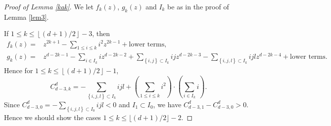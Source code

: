 \documentclass[12pt]{amsart}
\theoremstyle{definition}
\theoremstyle{remark}
\numberwithin{equation}{section}
\def\NZQ{\mathbb}               %
\def\ZZ{{\NZQ Z}}
\begin{document}
\begin{proof}[Proof of Lemma \ref{kak}]
	We let $f_k(z)$, $g_k(z)$ and  $I_k$ be as in the proof of Lemma \ref{lem3}.
	 
	If $1 \leq k \leq \left\lfloor (d+1)/2 \right\rfloor -3$, then
	\begin{displaymath}
	\begin{aligned}
	f_k(z)=&z^{2k+1}-\sum\limits_{1 \leq i \leq k}i^2z^{2k-1}+\text{lower terms},\\
	g_k(z)=&z^{d-2k-1}-\sum\limits_{i\in I_k}iz^{d-2k-2}+\sum\limits_{\left\{i,j\right\}\subset I_k}ijz^{d-2k-3}-\sum\limits_{\left\{i,j,l\right\}\subset I_k}ijlz^{d-2k-4}+\text{lower terms}.
	\end{aligned} 
	\end{displaymath}
	Hence for $1 \leq k \leq \left\lfloor (d+1)/2 \right\rfloor -1$,
	$$C_{d-3,k}^d=-\sum\limits_{\left\{i,j,l\right\}\subset I_k}ijl+\left(\sum\limits_{1 \leq i \leq k}i^2\right)\cdot\left(\sum\limits_{i\in I_k}i\right).$$
  Since $C_{d-3,0}^d=-\sum_{\left\{i,j,l\right\}\subset I_0}ijl<0$
  and  $I_1 \subset I_0$,	%
	we have $C_{d-3,1}^d-C_{d-3,0}^d>0$.
	Hence we should show the cases $1 \leq k \leq \lfloor(d+1)/2\rfloor-2$.
	

\end{proof}
\end{document}
